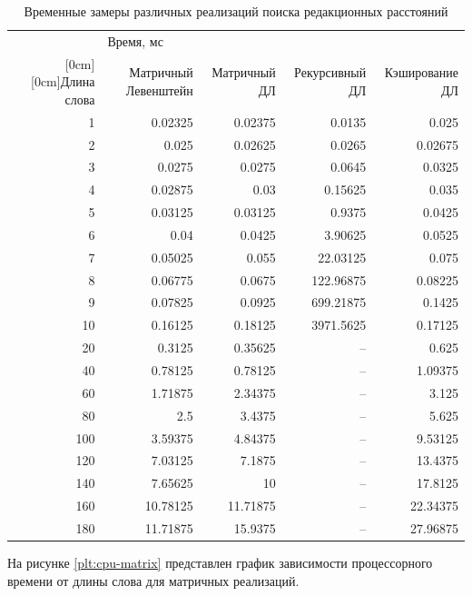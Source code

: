 \begin{table}[H]
	\centering
	\footnotesize
	\caption{\label{table:time} Временные замеры различных реализаций поиска редакционных расстояний}
	\begin{center}
		\begin{tabular}{|r|r|r|r|r|}
			\hline
			& \multicolumn{4}{l|}{Время, мс} \\
			\cline{2-5}
			\raisebox{1.5ex}[0cm][0cm]{Длина слова}
			& Матричный Левенштейн & Матричный ДЛ & Рекурсивный ДЛ & Кэширование ДЛ \\
			\hline
			1 & 0.02325 & 0.02375 & 0.0135 & 0.025 \\ \hline
			2 & 0.025 & 0.02625 & 0.0265 & 0.02675 \\ \hline
			3 & 0.0275 & 0.0275 & 0.0645 & 0.0325 \\ \hline
			4 & 0.02875 & 0.03 & 0.15625 & 0.035 \\ \hline
			5 & 0.03125 & 0.03125 & 0.9375 & 0.0425 \\ \hline
			6 & 0.04 & 0.0425 & 3.90625 & 0.0525 \\ \hline
			7 & 0.05025 & 0.055 & 22.03125 & 0.075 \\ \hline
			8 & 0.06775 & 0.0675 & 122.96875 & 0.08225 \\ \hline
			9 & 0.07825 & 0.0925 & 699.21875 & 0.1425 \\ \hline
			10 & 0.16125 & 0.18125 & 3971.5625 & 0.17125 \\ \hline
			20 & 0.3125 & 0.35625 & -- & 0.625 \\ \hline
			40 & 0.78125 & 0.78125 & -- & 1.09375 \\ \hline
			60 & 1.71875 & 2.34375 & -- & 3.125 \\ \hline
			80 & 2.5 & 3.4375 & -- & 5.625 \\ \hline
			100 & 3.59375 & 4.84375 & -- & 9.53125 \\ \hline
			120 & 7.03125 & 7.1875 & -- & 13.4375 \\ \hline
			140 & 7.65625 & 10 & -- & 17.8125 \\ \hline
			160 & 10.78125 & 11.71875 & -- & 22.34375 \\ \hline
			180 & 11.71875 & 15.9375 & -- & 27.96875 \\ \hline
		\end{tabular}
	\end{center}
\end{table}

На рисунке \ref{plt:cpu-matrix} представлен график зависимости процессорного времени от длины слова для матричных реализаций.

